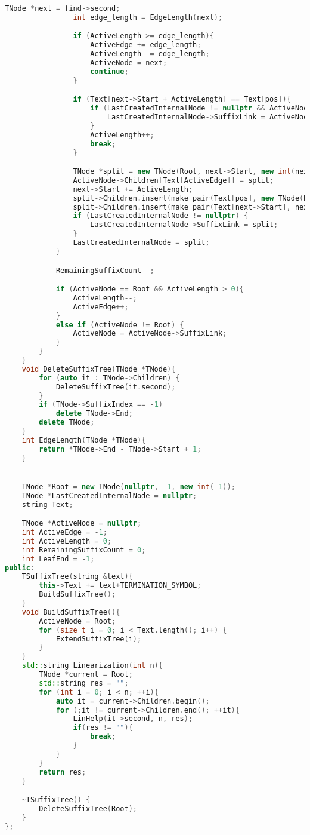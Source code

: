 \begin{lstlisting}[language=C++]
                TNode *next = find->second;
                int edge_length = EdgeLength(next);

                if (ActiveLength >= edge_length){
                    ActiveEdge += edge_length;
                    ActiveLength -= edge_length;
                    ActiveNode = next;
                    continue;
                }

                if (Text[next->Start + ActiveLength] == Text[pos]){
                    if (LastCreatedInternalNode != nullptr && ActiveNode != Root) {
                        LastCreatedInternalNode->SuffixLink = ActiveNode;
                    }
                    ActiveLength++;
                    break;
                }

                TNode *split = new TNode(Root, next->Start, new int(next->Start + ActiveLength - 1));
                ActiveNode->Children[Text[ActiveEdge]] = split;
                next->Start += ActiveLength;
                split->Children.insert(make_pair(Text[pos], new TNode(Root, pos, &LeafEnd, pos - RemainingSuffixCount + 1)));
                split->Children.insert(make_pair(Text[next->Start], next));
                if (LastCreatedInternalNode != nullptr) {
                    LastCreatedInternalNode->SuffixLink = split;
                }
                LastCreatedInternalNode = split;
            }

            RemainingSuffixCount--;

            if (ActiveNode == Root && ActiveLength > 0){
                ActiveLength--;
                ActiveEdge++;
            }
            else if (ActiveNode != Root) {
                ActiveNode = ActiveNode->SuffixLink;
            }
        }
    }
    void DeleteSuffixTree(TNode *TNode){
        for (auto it : TNode->Children) {
            DeleteSuffixTree(it.second);
        }
        if (TNode->SuffixIndex == -1)
            delete TNode->End;
        delete TNode;
    }
    int EdgeLength(TNode *TNode){
        return *TNode->End - TNode->Start + 1;
    }


    TNode *Root = new TNode(nullptr, -1, new int(-1));
    TNode *LastCreatedInternalNode = nullptr;
    string Text;

    TNode *ActiveNode = nullptr;
    int ActiveEdge = -1;
    int ActiveLength = 0;
    int RemainingSuffixCount = 0;
    int LeafEnd = -1;
public:
    TSuffixTree(string &text){
        this->Text += text+TERMINATION_SYMBOL;
        BuildSuffixTree();
    }
    void BuildSuffixTree(){
        ActiveNode = Root;
        for (size_t i = 0; i < Text.length(); i++) {
            ExtendSuffixTree(i);
        }
    }
    std::string Linearization(int n){
        TNode *current = Root;
        std::string res = "";
        for (int i = 0; i < n; ++i){
            auto it = current->Children.begin();
            for (;it != current->Children.end(); ++it){
                LinHelp(it->second, n, res);
                if(res != ""){
                    break;
                }
            }
        }
        return res;
    }

    ~TSuffixTree() {
        DeleteSuffixTree(Root);
    }
};
\end{lstlisting}
